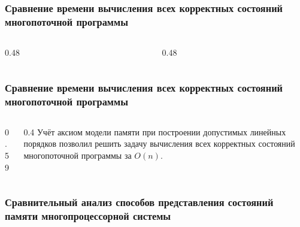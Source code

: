 \begin{frame}
  \frametitle{Сравнение времени вычисления всех корректных состояний
  многопоточной программы}

  \begin{columns}[T, onlytextwidth]
    \begin{column}{0.48\textwidth}
      \scalebox{0.9}{
      }
    \end{column}
    \begin{column}{0.48\textwidth}
      \scalebox{0.9}{
      }
    \end{column}
  \end{columns}
\end{frame}

\begin{frame}
  \frametitle{Сравнение времени вычисления всех корректных состояний
  многопоточной программы}

  \begin{columns}[T, onlytextwidth]
    \begin{column}{0.59\textwidth}
      \scalebox{0.9}{
      }
    \end{column}
    \begin{column}{0.4\textwidth}
      \vspace{65pt}
      Учёт аксиом модели памяти при построении допустимых линейных
      порядков позволил решить задачу вычисления всех корректных
      состояний многопоточной программы за $O(n)$.
    \end{column}
  \end{columns}
\end{frame}

\begin{frame}
  \frametitle{Сравнительный анализ способов представления состояний памяти
  многопроцессорной системы}

  \centering
  \scalebox{0.85}{}
  \label{fig:sgnds-vs-linext}

\end{frame}

